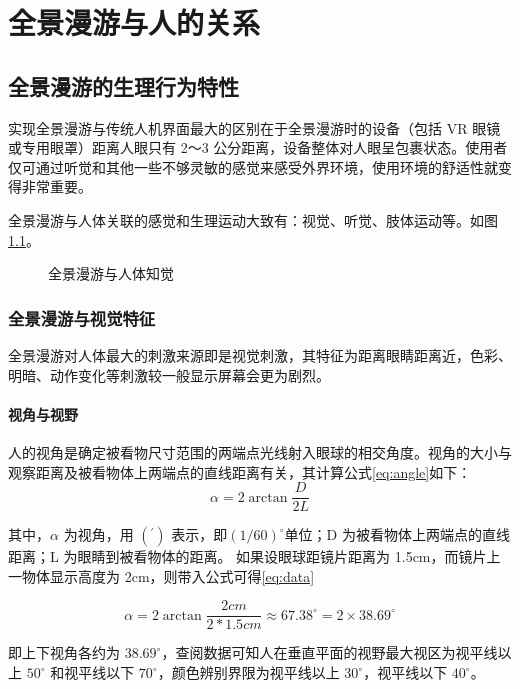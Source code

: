 \chapter{全景漫游与人的关系}

\section{全景漫游的生理行为特性}
实现全景漫游与传统人机界面最大的区别在于全景漫游时的设备（包括 VR 眼镜或专用眼罩）距离人眼只有 2～3 公分距离，设备整体对人眼呈包裹状态。使用者仅可通过听觉和其他一些不够灵敏的感觉来感受外界环境，使用环境的舒适性就变得非常重要。

全景漫游与人体关联的感觉和生理运动大致有：视觉、听觉、肢体运动等。如图\ref{fig:human_sence}。

\begin{figure}[htp]
\centering
{}
\caption{全景漫游与人体知觉}
\label{fig:human_sence}
\end{figure}

\subsection{全景漫游与视觉特征}
全景漫游对人体最大的刺激来源即是视觉刺激，其特征为距离眼睛距离近，色彩、明暗、动作变化等刺激较一般显示屏幕会更为剧烈。

\subsubsection{视角与视野}

人的视角是确定被看物尺寸范围的两端点光线射入眼球的相交角度。视角的大小与观察距离及被看物体上两端点的直线距离有关，其计算公式\ref{eq:angle}如下：
\begin{equation}
\alpha=2\arctan{\frac{D}{2L}}
\label{eq:angle}
\end{equation}

其中，$\alpha$ 为视角，用 $(^{\prime})$ 表示，即$(1/60)^{\circ}$单位；D 为被看物体上两端点的直线距离；L 为眼睛到被看物体的距离。
如果设眼球距镜片距离为 1.5cm，而镜片上一物体显示高度为 2cm，则带入公式可得\ref{eq:data}

\begin{equation}
\alpha=2\arctan{\frac{2cm}{2*1.5cm}}\approx 67.38 ^{\circ} = 2 \times 38.69^{\circ}
\label{eq:data}
\end{equation}

即上下视角各约为 $38.69^{\circ}$，查阅数据可知人在垂直平面的视野最大视区为视平线以上 $50^{\circ}$ 和视平线以下 $70^{\circ}$，颜色辨别界限为视平线以上 $30^{\circ}$，视平线以下 $40^{\circ}$。

